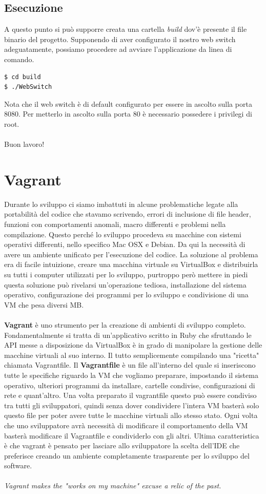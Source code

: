 \documentclass[italian]{tktltiki2}
\begin{document}
\subsection{Esecuzione} \label{ssec: execution}
A questo punto si può supporre creata una cartella \emph{build} dov'è presente il file binario del progetto. Supponendo di aver configurato il nostro web switch adeguatamente, possiamo procedere ad avviare l'applicazione da linea di comando.
\begin{lstlisting}
$ cd build
$ ./WebSwitch  

\end{lstlisting}
Nota che il web switch è di default configurato per essere in ascolto sulla porta 8080. Per metterlo in ascolto sulla porta 80 è necessario possedere i privilegi di root.
\\
\\
Buon lavoro!
\newpage
\section{Vagrant}
Durante lo sviluppo ci siamo imbattuti in alcune problematiche
legate alla portabilità del codice che stavamo scrivendo, errori di inclusione di file header, funzioni con comportamenti anomali, macro differenti e problemi nella compilazione. Questo perché lo sviluppo procedeva su macchine con sistemi operativi differenti, nello specifico Mac OSX e Debian. Da qui la necessità di avere un ambiente unificato per l'esecuzione del codice. La soluzione al problema era di facile intuizione, creare una macchina virtuale su VirtualBox e distribuirla su tutti i computer utilizzati per lo sviluppo, purtroppo però mettere in piedi questa soluzione può rivelarsi un'operazione tediosa, installazione del sistema operativo, configurazione dei programmi per lo sviluppo e condivisione di una VM che pesa diversi MB.\\\\
\textbf{Vagrant}\cite{vagrant} è uno strumento per la creazione di ambienti di sviluppo completo. Fondamentalmente si tratta di un’applicativo scritto in Ruby che sfruttando le API messe a disposizione da VirtualBox è in grado di manipolare la gestione delle macchine virtuali al suo interno. Il tutto semplicemente compilando una "ricetta" chiamata Vagrantfile. Il \textbf{Vagrantfile} è un file all’interno del quale si inseriscono tutte le specifiche riguardo la VM che vogliamo preparare, impostando il sistema operativo, ulteriori programmi da installare, cartelle condivise, configurazioni di rete e quant'altro. Una volta preparato il vagrantfile questo può essere condiviso tra tutti gli sviluppatori, quindi senza dover condividere l'intera VM basterà solo questo file per poter avere tutte le macchine virtuali allo stesso stato. Ogni volta che uno sviluppatore avrà necessità di modificare il comportamento della VM basterà modificare il Vagrantfile e condividerlo con gli altri. Ultima caratteristica è che vagrant è pensato per lasciare allo sviluppatore la scelta dell'IDE che preferisce creando un ambiente completamente trasparente per lo sviluppo del software.\\\\
\emph{Vagrant makes the "works on my machine" excuse a relic of the past.}
\end{document}
